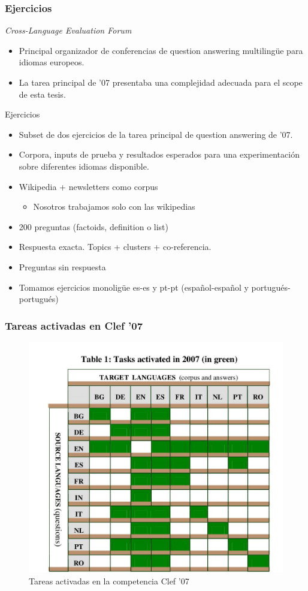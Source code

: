 \begin{frame}[<+->]
\frametitle{Ejercicios}
  \textit{Cross-Language Evaluation Forum}
  \begin{itemize}
    \item Principal organizador de conferencias de question answering multilingüe para idiomas europeos.
    \item La tarea principal de '07 presentaba una complejidad adecuada para el scope de esta tesis.
  \end{itemize}
  Ejercicios
  \begin{itemize}
    \item Subset de dos ejercicios de la tarea principal de question answering de '07. 
    \item Corpora, inputs de prueba y resultados esperados para una experimentación sobre diferentes idiomas disponible.
    \item Wikipedia + newsletters como corpus
    \begin{itemize}
      \item Nosotros trabajamos solo con las wikipedias
    \end{itemize}
    \item 200 preguntas (factoids, definition o list)
    \item Respuesta exacta. Topics + clusters + co-referencia.
    \item Preguntas sin respuesta
    \item Tomamos ejercicios monoligüe es-es y pt-pt (español-español y portugués-portugués)
  \end{itemize}
\end{frame}


\begin{frame}
  \frametitle{Tareas activadas en Clef '07}
  \begin{figure}
      \includegraphics[scale=0.4]{graficos/clef07}
    \caption{Tareas activadas en la competencia Clef '07}
    \label{fig:tareas}
  \end{figure}
\end{frame}

